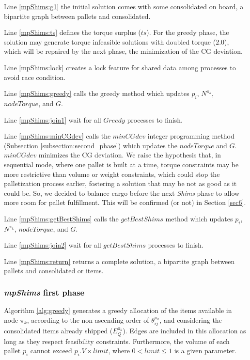 \documentclass[preprint,authoryear]{elsarticle}
\begin{document}
Line \ref{mpShims:g1} the initial solution comes with some consolidated on board, a bipartite graph between pallets and consolidated.

Line \ref{mpShims:ts} defines the torque surplus ($ts$). For the greedy phase, the solution may generate torque infeasible solutions with doubled torque ($2.0$), which will be repaired by the next phase, the minimization of the CG deviation.

Line \ref{mpShims:lock} creates a lock feature for shared data among processes to avoid race condition.

Line \ref{mpShims:greedy} calls the greedy method which updates $p_i$, $N^{\pi_k}$, $nodeTorque$, and $G$.

Line \ref{mpShims:join1} wait for all $Greedy$ processes to finish.

Line \ref{mpShims:minCGdev} calls the $minCGdev$ integer programming method (Subsection \ref{subsection:second_phase}) which updates the $nodeTorque$ and $G$. $minCGdev$ minimizes the CG deviation. We raise the hypothesis that, in sequential mode, where one pallet is built at a time, torque constraints may be more restrictive than volume or weight constraints, which could stop the palletization process earlier, fostering a solution that may be not as good as it could be. So, we decided to balance cargo before the next {\it Shims} phase to allow more room for pallet fulfillment. This will be confirmed (or not) in Section \ref{sec6}.

Line \ref{mpShims:getBestShims} calls the $getBestShims$ method which updates $p_i$, $N^{\pi_k}$, $nodeTorque$, and $G$.

Line \ref{mpShims:join2} wait for all $getBestShims$ processes to finish.

Line \ref{mpShims:return} returns a complete solution, a bipartite graph between pallets and consolidated or items.

\subsubsection{{\it mpShims} first phase}


Algorithm \ref{alg:greedy} generates a greedy allocation of the items available in node ${\pi_k}$, according to the non-ascending order of $\theta^{\pi_k}_{ij}$, and considering the consolidated items already shipped ($E_Q^{\pi_k}$). Edges are included in this allocation as long as they respect feasibility constraints. Furthermore, the volume of each pallet $p_i$\/ cannot exceed $p_i.V \times limit$, where $ 0 < limit \leq 1$\/ is a given parameter.
\end{document}
